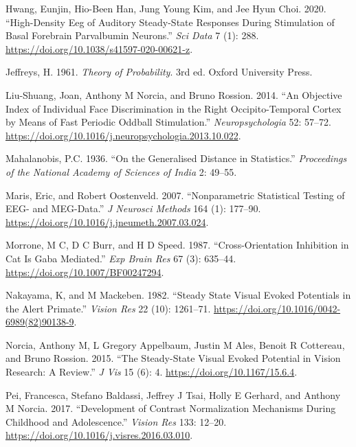 \documentclass[]{article}
\begin{document}
\leavevmode\hypertarget{ref-Hwang2020}{}%
Hwang, Eunjin, Hio-Been Han, Jung Young Kim, and Jee Hyun Choi. 2020. ``High-Density Eeg of Auditory Steady-State Responses During Stimulation of Basal Forebrain Parvalbumin Neurons.'' \emph{Sci Data} 7 (1): 288. \url{https://doi.org/10.1038/s41597-020-00621-z}.

\leavevmode\hypertarget{ref-Jeffreys1961}{}%
Jeffreys, H. 1961. \emph{Theory of Probability}. 3rd ed. Oxford University Press.

\leavevmode\hypertarget{ref-Liu-Shuang2014}{}%
Liu-Shuang, Joan, Anthony M Norcia, and Bruno Rossion. 2014. ``An Objective Index of Individual Face Discrimination in the Right Occipito-Temporal Cortex by Means of Fast Periodic Oddball Stimulation.'' \emph{Neuropsychologia} 52: 57--72. \url{https://doi.org/10.1016/j.neuropsychologia.2013.10.022}.

\leavevmode\hypertarget{ref-Mahalanobis1936}{}%
Mahalanobis, P.C. 1936. ``On the Generalised Distance in Statistics.'' \emph{Proceedings of the National Academy of Sciences of India} 2: 49--55.

\leavevmode\hypertarget{ref-Maris2007}{}%
Maris, Eric, and Robert Oostenveld. 2007. ``Nonparametric Statistical Testing of EEG- and MEG-Data.'' \emph{J Neurosci Methods} 164 (1): 177--90. \url{https://doi.org/10.1016/j.jneumeth.2007.03.024}.

\leavevmode\hypertarget{ref-Morrone1987}{}%
Morrone, M C, D C Burr, and H D Speed. 1987. ``Cross-Orientation Inhibition in Cat Is Gaba Mediated.'' \emph{Exp Brain Res} 67 (3): 635--44. \url{https://doi.org/10.1007/BF00247294}.

\leavevmode\hypertarget{ref-Nakayama1982}{}%
Nakayama, K, and M Mackeben. 1982. ``Steady State Visual Evoked Potentials in the Alert Primate.'' \emph{Vision Res} 22 (10): 1261--71. \url{https://doi.org/10.1016/0042-6989(82)90138-9}.

\leavevmode\hypertarget{ref-Norcia2015}{}%
Norcia, Anthony M, L Gregory Appelbaum, Justin M Ales, Benoit R Cottereau, and Bruno Rossion. 2015. ``The Steady-State Visual Evoked Potential in Vision Research: A Review.'' \emph{J Vis} 15 (6): 4. \url{https://doi.org/10.1167/15.6.4}.

\leavevmode\hypertarget{ref-Pei2017}{}%
Pei, Francesca, Stefano Baldassi, Jeffrey J Tsai, Holly E Gerhard, and Anthony M Norcia. 2017. ``Development of Contrast Normalization Mechanisms During Childhood and Adolescence.'' \emph{Vision Res} 133: 12--20. \url{https://doi.org/10.1016/j.visres.2016.03.010}.
\end{document}
